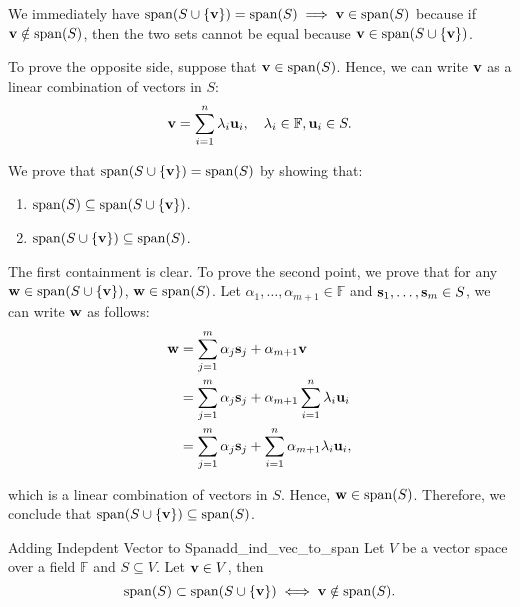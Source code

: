 \begin{proof*}
	We immediately have $\mathrm{span} (S\cup\{{\bf v}\}) = \mathrm{span} (S) \implies {\bf v}\in\mathrm{span}(S)$	because if ${\bf v}\notin\mathrm{span}(S)$, then the two sets cannot be equal because ${\bf v}\in\mathrm{span}(S\cup\{{\bf v}\})$.

	\noindent\newline To prove the opposite side, suppose that ${\bf v}\in\mathrm{span}(S)$. Hence, we can write ${\bf v}$ as a linear combination of vectors in $S$:
	\begin{align*}
		{\bf v} = \sum_{i=1}^n \lambda_i {\bf u}_i, \quad \lambda_i \in \mathbb{F}, {\bf u}_i \in S.	
	\end{align*} 

	\noindent We prove that $\mathrm{span} (S\cup\{{\bf v}\}) = \mathrm{span}(S)$ by showing that: 
	\begin{enumerate}
		\item $\mathrm{span} (S)\subseteq \mathrm{span} (S\cup\{{\bf v}\})$.
		\item $\mathrm{span} (S\cup\{{\bf v}\})\subseteq \mathrm{span} (S)$.
	\end{enumerate} 

	\noindent The first containment is clear. To prove the second point, we prove that for any ${\bf w} \in \mathrm{span}(S\cup\{{\bf v}\})$, ${\bf w}\in\mathrm{span}(S)$. Let $\alpha_1, \dots, \alpha_{m+1} \in \mathbb{F}$ and ${\bf s}_1, \dots, {\bf s}_m \in S$, we can write ${\bf w}$ as follows:
	\begin{align*}
		{\bf w} &= \sum_{j=1}^m \alpha_j {\bf s}_j + \alpha_{m+1}{\bf v} \\
			&= \sum_{j=1}^m \alpha_j {\bf s}_j + \alpha_{m+1}\sum_{i=1}^n \lambda_i {\bf u}_i \\
			&= \sum_{j=1}^m \alpha_j {\bf s}_j + \sum_{i=1}^n \alpha_{m+1}\lambda_i {\bf u}_i,
	\end{align*} 

	\noindent which is a linear combination of vectors in $S$. Hence, ${\bf w}\in\mathrm{span}(S)$. Therefore, we conclude that $\mathrm{span}(S\cup\{{\bf v}\}) \subseteq \mathrm{span}(S)$.
\end{proof*} 


\begin{corollary}{Adding Indepdent Vector to Span}{add_ind_vec_to_span}
	Let $V$ be a vector space over a field $\mathbb{F}$ and $S\subseteq V$. Let ${\bf v}\in V$, then
	\begin{equation}
		\mathrm{span}(S) \subset \mathrm{span}(S\cup\{{\bf v}\}) \iff {\bf v}\notin \mathrm{span}(S).		
	\end{equation} 	
\end{corollary} 

